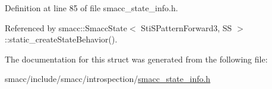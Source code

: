 Definition at line 85 of file smacc\+\_\+state\+\_\+info.\+h.



Referenced by smacc\+::\+Smacc\+State$<$ Sti\+S\+Pattern\+Forward3, S\+S $>$\+::static\+\_\+create\+State\+Behavior().



The documentation for this struct was generated from the following file\+:\begin{DoxyCompactItemize}
\item 
smacc/include/smacc/introspection/\hyperlink{smacc__state__info_8h}{smacc\+\_\+state\+\_\+info.\+h}\end{DoxyCompactItemize}
